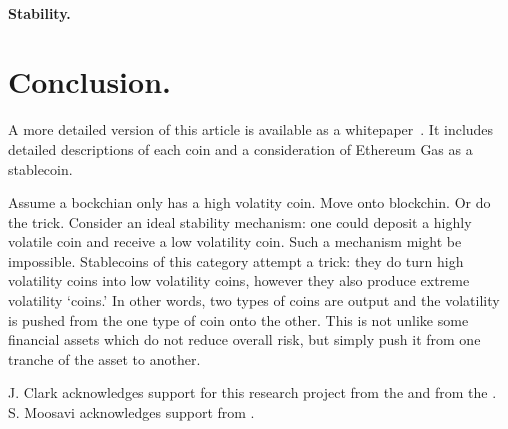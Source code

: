 \paragraph{Stability.}

\section{Conclusion.}

A more detailed version of this article is available as a whitepaper~\cite{CDM19}. It includes detailed descriptions of each coin and a consideration of Ethereum Gas as a stablecoin. 

Assume a bockchian only has a high volatity coin. Move onto blockchin. Or do the trick. 
Consider an ideal stability mechanism: one could deposit a highly volatile coin and receive a low volatility coin. Such a mechanism might be impossible. Stablecoins of this category attempt a trick: they do turn high volatility coins into low volatility coins, however they also produce extreme volatility `coins.' In other words, two types of coins are output and the volatility is pushed from the one type of coin onto the other. This is not unlike some financial assets which do not reduce overall risk, but simply push it from one tranche of the asset to another.

\begin{acks}

J. Clark acknowledges support for this research project from the  and from the . S. Moosavi acknowledges support from .


\end{acks}










